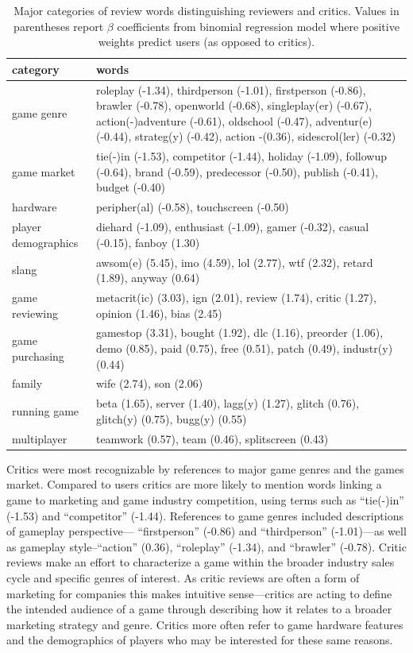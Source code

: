 \documentclass[letterpaper]{article}
\begin{document}
\begin{table}[tbh]
\begin{tabularx}{\linewidth}{|X|X|}
\hline category & words \\ 
\hline game genre & roleplay (-1.34), thirdperson (-1.01), firstperson (-0.86), brawler (-0.78), openworld (-0.68), singleplay(er) (-0.67), action(-)adventure (-0.61), oldschool (-0.47), adventur(e) (-0.44), strateg(y) (-0.42), action -(0.36), sidescrol(ler) (-0.32) \\ 
\hline game market & tie(-)in (-1.53), competitor (-1.44), holiday (-1.09), followup (-0.64), brand (-0.59), predecessor (-0.50), publish (-0.41), budget (-0.40) \\ 
\hline hardware & peripher(al) (-0.58), touchscreen (-0.50) \\ 
\hline player demographics & diehard (-1.09), enthusiast (-1.09), gamer (-0.32), casual (-0.15), fanboy (1.30) \\ 
\hline slang & awsom(e) (5.45), imo (4.59), lol (2.77), wtf (2.32), retard (1.89), anyway (0.64) \\ 
\hline game reviewing & metacrit(ic) (3.03), ign (2.01), review (1.74), critic (1.27), opinion (1.46), bias (2.45) \\ 
\hline game purchasing & gamestop (3.31), bought (1.92), dlc (1.16), preorder (1.06), demo (0.85), paid (0.75), free (0.51), patch (0.49), industr(y) (0.44) \\ 
\hline family & wife (2.74), son (2.06) \\ 
\hline running game & beta (1.65), server (1.40), lagg(y) (1.27), glitch (0.76), glitch(y) (0.75), bugg(y) (0.55) \\ 
\hline multiplayer & teamwork (0.57), team (0.46), splitscreen (0.43) \\
\hline 
\end{tabularx}
\caption{Major categories of review words distinguishing reviewers and critics. Values in parentheses report $\beta$ coefficients from binomial regression model where positive weights predict users (as opposed to critics).}
\label{tab:user_classification_coef}
\end{table}

Critics were most recognizable by references to major game genres and the games market. Compared to users critics are more likely to mention words linking a game to marketing and game industry competition, using terms such as ``tie(-)in'' (-1.53) and ``competitor'' (-1.44). References to game genres included descriptions of gameplay perspective--- ``firstperson'' (-0.86) and ``thirdperson'' (-1.01)---as well as gameplay style--``action'' (0.36), ``roleplay'' (-1.34),  and ``brawler'' (-0.78). Critic reviews make an effort to characterize a game within the broader industry sales cycle and specific genres of interest. As critic reviews are often a form of marketing for companies this makes intuitive sense---critics are acting to define the intended audience of a game through describing how it relates to a broader marketing strategy and genre. Critics more often refer to game hardware features and the demographics of players who may be interested for these same reasons.
\end{document}
